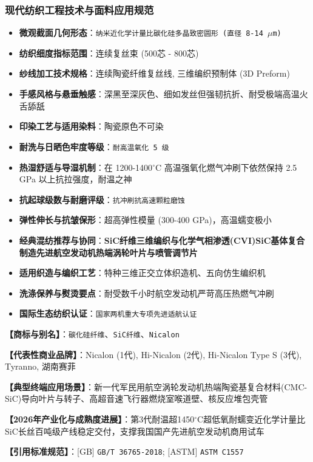 \documentclass[11pt,openright,twoside,UTF8]{ctexbook}
\begin{document}
\subsubsection*{现代纺织工程技术与面料应用规范}
\begin{itemize} \setlength{\itemsep}{2pt}
    \item \textbf{微观截面几何形态}：\texttt{纳米近化学计量比碳化硅多晶致密圆形 (直径 8-14 $\mu$m)}
    \item \textbf{纺织细度指标范围}：连续复丝束 (500芯 - 800芯)
    \item \textbf{纱线加工技术规格}：连续陶瓷纤维复丝线, 三维编织预制体 (3D Preform)
    \item \textbf{手感风格与悬垂触感}：深黑至深灰色、细如发丝但强韧抗折、耐受极端高温火舌舔舐
    \item \textbf{印染工艺与适用染料}：陶瓷原色不可染
    \item \textbf{耐洗与日晒色牢度等级}：\texttt{耐高温氧化 5 级}
    \item \textbf{热湿舒适与导湿机制}：在 1200-1400$^\circ\mathrm{C}$ 高温强氧化燃气冲刷下依然保持 2.5 GPa 以上抗拉强度，耐温之神
    \item \textbf{抗起球级数与耐磨评级}：\texttt{抗冲刷抗高速颗粒磨蚀}
    \item \textbf{弹性伸长与抗皱保形}：超高弹性模量 (300-400 GPa)，高温蠕变极小
    \item \textbf{经典混纺推荐与协同}：\textbf{SiC纤维三维编织与化学气相渗透(CVI)SiC基体复合制造先进航空发动机热端涡轮叶片与喷管调节片}
    \item \textbf{适用织造与编织工艺}：特种三维正交立体织造机、五向仿生编织机
    \item \textbf{洗涤保养与熨烫要点}：耐受数千小时航空发动机严苛高压热燃气冲刷
    \item \textbf{国际生态纺织认证}：\texttt{国家两机重大专项先进适航认证}
\end{itemize}
\vspace{0.2cm}

\noindent\textbf{【商标与别名】}：\texttt{碳化硅纤维}、\texttt{SiC纤维}、\texttt{Nicalon}\par
\noindent\textbf{【代表性商业品牌】}：Nicalon (1代), Hi-Nicalon (2代), Hi-Nicalon Type S (3代), Tyranno, 湖南赛菲\par
\noindent\textbf{【典型终端应用场景】}：新一代军民用航空涡轮发动机热端陶瓷基复合材料(CMC-SiC)导向叶片与转子、高超音速飞行器燃烧室喉道壁、核反应堆包壳管\par
\noindent\textbf{【2026年产业化与成熟度进展】}：第3代耐温超1450$^\circ\mathrm{C}$超低氧耐蠕变近化学计量比SiC长丝百吨级产线稳定交付，支撑我国国产先进航空发动机商用试车\par
\noindent\textbf{【引用标准规范】}：[GB] \texttt{GB/T 36765-2018}; [ASTM] \texttt{ASTM C1557}\par
\vspace{0.5cm}
\end{document}
